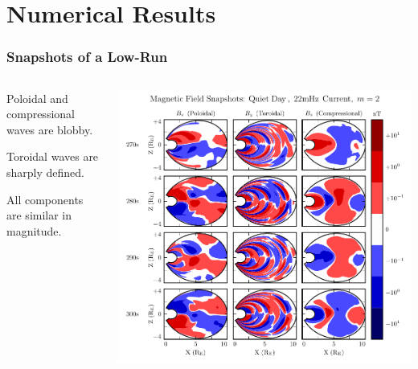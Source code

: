 \documentclass{beamer}
\begin{document}

\section{Numerical Results}


\begin{frame}
\frametitle{Snapshots of a Low-\azm Run}

\begin{columns}
\begin{wideitemize}
\item Poloidal and compressional waves are blobby. 
\item Toroidal waves are sharply defined. 
\item All components are similar in magnitude. 
\end{wideitemize}
\includegraphics[width=\textwidth]{figures/snapshot_smallm.pdf}
\end{columns}

\end{frame}
\end{document}
